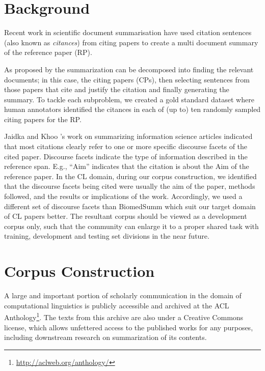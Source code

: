 \documentclass[11pt]{article}
\begin{document}
\section{Background}
Recent work \cite{mohammad2009,abu2011} in scientific document
summarisation have used citation sentences (also known as {\it
  citances}) from citing papers to create a multi document summary of
the reference paper (RP).

As proposed by \cite{vu2010,hoang2010} the summarization can be
decomposed into finding the relevant documents; in this case, the
citing papers (CPs), then selecting sentences from those papers that
cite and justify the citation and finally generating the summary. To
tackle each subproblem, we created a gold standard dataset where human
annotators identified the citances in each of (up to) ten randomly sampled
citing papers for the RP.


Jaidka and Khoo 's work on summarizing
information science articles indicated that most citations clearly
refer to one or more specific discourse facets of the cited paper. 
Discourse facets indicate the type of information described in the 
reference span. E.g., ``Aim'' indicates that the citation is about the 
Aim of the reference paper. In the CL domain, during our corpus 
construction, we identified that the discourse facets being cited 
were usually the aim of the paper, methods followed, and the results 
or implications of the work. Accordingly, we used a different set of 
discourse facets than BiomedSumm which suit our target domain of CL 
papers better. The resultant corpus should be viewed as a development 
corpus only, such that the community can enlarge it to a proper shared 
task with training, development and testing set divisions in the near 
future.


\section{Corpus Construction}
\label{corpus}
A large and important portion of scholarly communication in the domain
of computational linguistics is publicly accessible and archived at
the ACL Anthology\footnote{\url{http://aclweb.org/anthology/}}.  The
texts from this archive are also under a Creative Commons license,
which allows unfettered access to the published works for any
purposes, including downstream research on summarization of its
contents.  
\end{document}
